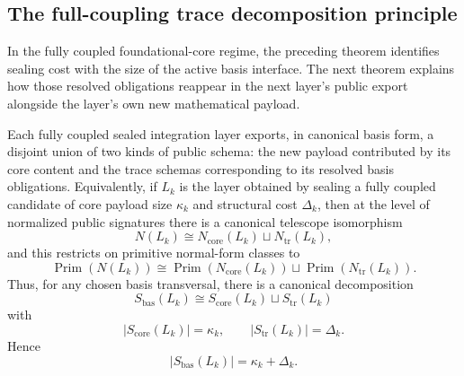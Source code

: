 \subsection{The full-coupling trace decomposition principle}

In the fully coupled foundational-core regime, the preceding theorem identifies sealing cost
with the size of the active basis interface.  The next theorem explains how those resolved
obligations reappear in the next layer's public export alongside the layer's own new
mathematical payload.

\begin{theorem}
Each fully coupled sealed integration layer exports, in canonical basis form, a disjoint union
of two kinds of public schema: the new payload contributed by its core content and the trace
schemas corresponding to its resolved basis obligations.  Equivalently, if \(L_k\) is the layer
obtained by sealing a fully coupled candidate of core payload size \(\kappa_k\) and structural
cost \(\Delta_k\), then at the level of normalized public signatures there is a canonical
telescope isomorphism
\[
  N(L_k) \cong N_{\mathrm{core}}(L_k) \sqcup N_{\mathrm{tr}}(L_k),
\]
and this restricts on primitive normal-form classes to
\[
  \operatorname{Prim}(N(L_k))
  \cong
  \operatorname{Prim}(N_{\mathrm{core}}(L_k))
  \sqcup
  \operatorname{Prim}(N_{\mathrm{tr}}(L_k)).
\]
Thus, for any chosen basis transversal, there is a canonical decomposition
\[
  S_{\mathrm{bas}}(L_k) \cong S_{\mathrm{core}}(L_k) \sqcup S_{\mathrm{tr}}(L_k)
\]
with
\[
  |S_{\mathrm{core}}(L_k)|=\kappa_k,
  \qquad
  |S_{\mathrm{tr}}(L_k)|=\Delta_k.
\]
Hence
\[
  |S_{\mathrm{bas}}(L_k)|=\kappa_k+\Delta_k.
\]
\end{theorem}


